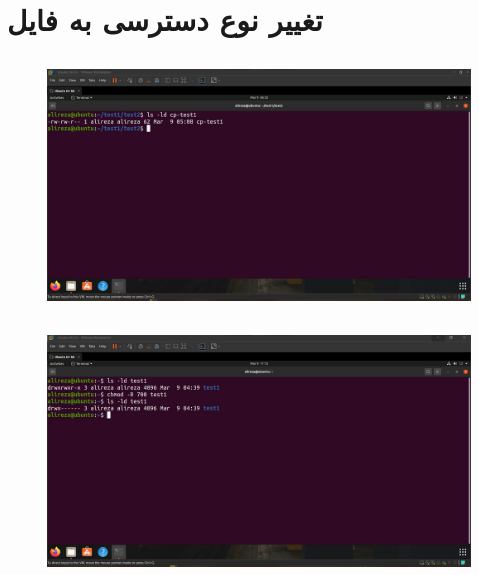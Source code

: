 \documentclass{article}
\begin{document}
\section{تغییر نوع دسترسی به فایل}
\subsection{}
\begin{figure}[H]
    \centering
    \includegraphics[width=1.0\textwidth]{figures/5a.jpg}
    \caption
	{
	}
    \label{fig:fig1}
\end{figure}

\subsection{}
\begin{figure}[H]
    \centering
    \includegraphics[width=1.0\textwidth]{figures/5b.jpg}
    \caption
	{
	}
    \label{fig:fig1}
\end{figure}
\end{document}
